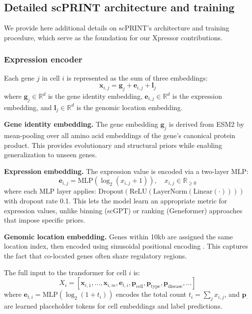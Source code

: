 \subsection{Detailed scPRINT architecture and training}
\label{sec:scprint_detail}

We provide here additional details on scPRINT's architecture and training procedure, which serve as the foundation for our Xpressor contributions.

\subsubsection{Expression encoder}
Each gene $j$ in cell $i$ is represented as the sum of three embeddings:
\begin{equation}
\mathbf{x}_{i,j} = \mathbf{g}_j + \mathbf{e}_{i,j} + \mathbf{l}_j
\end{equation}
where $\mathbf{g}_j \in \mathbb{R}^d$ is the gene identity embedding, $\mathbf{e}_{i,j} \in \mathbb{R}^d$ is the expression embedding, and $\mathbf{l}_j \in \mathbb{R}^d$ is the genomic location embedding.

\textbf{Gene identity embedding.} The gene embedding $\mathbf{g}_j$ is derived from \gls{ESM}2 by mean-pooling over all amino acid embeddings of the gene's canonical protein product. This provides evolutionary and structural priors while enabling generalization to unseen genes.

\textbf{Expression embedding.} The expression value is encoded via a two-layer \gls{MLP}:
\begin{equation}
\mathbf{e}_{i,j} = \text{MLP}(\log_2(x_{i,j} + 1)), \quad x_{i,j} \in \mathbb{R}_{\geq 0}
\end{equation}
where each \gls{MLP} layer applies: $\text{Dropout}(\text{ReLU}(\text{LayerNorm}(\text{Linear}(\cdot))))$ with dropout rate 0.1. This lets the model learn an appropriate metric for expression values, unlike binning (\gls{scGPT}) or ranking (Geneformer) approaches that impose specific priors.

\textbf{Genomic location embedding.} Genes within 10kb are assigned the same location index, then encoded using sinusoidal positional encoding \citep{vaswaniAttentionAllYou2023}. This captures the fact that co-located genes often share regulatory regions.

The full input to the transformer for cell $i$ is:
\begin{equation}
X_i = [\mathbf{x}_{i,1}, \ldots, \mathbf{x}_{i,m}, \mathbf{e}_{t,i}, \mathbf{p}_{\text{cell}}, \mathbf{p}_{\text{type}}, \mathbf{p}_{\text{disease}}, \ldots]
\end{equation}
where $\mathbf{e}_{t,i} = \text{MLP}(\log_2(1 + t_i))$ encodes the total count $t_i = \sum_j x_{i,j}$, and $\mathbf{p}_{\cdot}$ are learned placeholder tokens for cell embeddings and label predictions.

